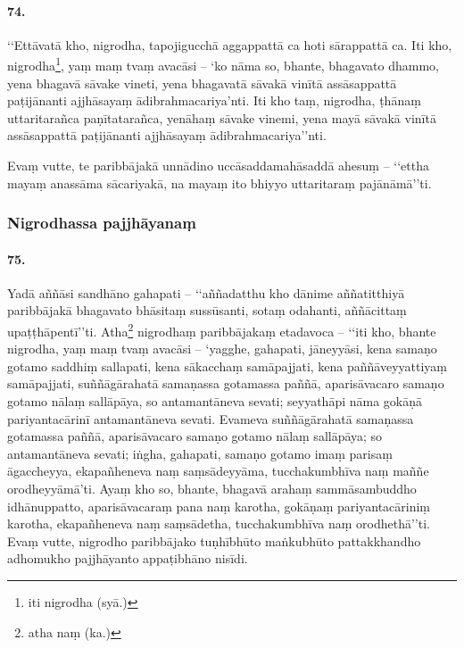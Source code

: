\paragraph{74.} ‘‘Ettāvatā kho, nigrodha, tapojigucchā aggappattā ca hoti sārappattā ca. Iti kho, nigrodha\footnote{iti nigrodha (syā.)}, yaṃ maṃ tvaṃ avacāsi – ‘ko nāma so, bhante, bhagavato dhammo, yena bhagavā sāvake vineti, yena bhagavatā sāvakā vinītā assāsappattā paṭijānanti ajjhāsayaṃ ādibrahmacariya’nti. Iti kho taṃ, nigrodha, ṭhānaṃ uttaritarañca paṇītatarañca, yenāhaṃ sāvake vinemi, yena mayā sāvakā vinītā assāsappattā paṭijānanti ajjhāsayaṃ ādibrahmacariya’’nti.

Evaṃ vutte, te paribbājakā unnādino uccāsaddamahāsaddā ahesuṃ – ‘‘ettha mayaṃ anassāma sācariyakā, na mayaṃ ito bhiyyo uttaritaraṃ pajānāmā’’ti.

\subsubsection{Nigrodhassa pajjhāyanaṃ}

\paragraph{75.} Yadā aññāsi sandhāno gahapati – ‘‘aññadatthu kho dānime aññatitthiyā paribbājakā bhagavato bhāsitaṃ sussūsanti, sotaṃ odahanti, aññācittaṃ upaṭṭhāpentī’’ti. Atha\footnote{atha naṃ (ka.)} nigrodhaṃ paribbājakaṃ etadavoca – ‘‘iti kho, bhante nigrodha, yaṃ maṃ tvaṃ avacāsi – ‘yagghe, gahapati, jāneyyāsi, kena samaṇo gotamo saddhiṃ sallapati, kena sākacchaṃ samāpajjati, kena paññāveyyattiyaṃ samāpajjati, suññāgārahatā samaṇassa gotamassa paññā, aparisāvacaro samaṇo gotamo nālaṃ sallāpāya, so antamantāneva sevati; seyyathāpi nāma gokāṇā pariyantacārinī antamantāneva sevati. Evameva suññāgārahatā samaṇassa gotamassa paññā, aparisāvacaro samaṇo gotamo nālaṃ sallāpāya; so antamantāneva sevati; iṅgha, gahapati, samaṇo gotamo imaṃ parisaṃ āgaccheyya, ekapañheneva naṃ saṃsādeyyāma, tucchakumbhīva naṃ maññe orodheyyāmā’ti. Ayaṃ kho so, bhante, bhagavā arahaṃ sammāsambuddho idhānuppatto, aparisāvacaraṃ pana naṃ karotha, gokāṇaṃ pariyantacāriniṃ karotha, ekapañheneva naṃ saṃsādetha, tucchakumbhīva naṃ orodhethā’’ti. Evaṃ vutte, nigrodho paribbājako tuṇhībhūto maṅkubhūto pattakkhandho adhomukho pajjhāyanto appaṭibhāno nisīdi.

